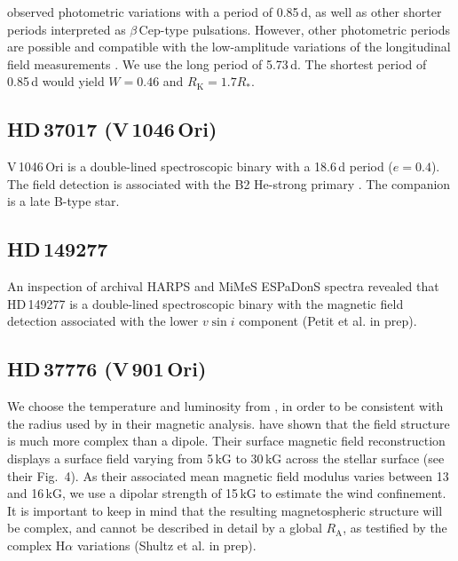 \documentclass[useAMS,usenatbib]{mn2e}
\newcommand{\ra}{R_\mathrm{A}}
\newcommand{\rk}{R_\mathrm{K}}
\newcommand{\rs}{R_\ast}
\newcommand{\vsini}{v \sin i}
\begin{document}
\citet{1991A&A...243..148M} observed photometric variations with a period of 0.85\,d, as well as other shorter periods interpreted as $\beta$\,Cep-type pulsations. However, other photometric periods are possible and compatible with the low-amplitude variations of the longitudinal field measurements \citep{Neiner2012_96446}. We use the long period of 5.73\,d. The shortest period of 0.85\,d would yield $W=0.46$ and $\rk=1.7\rs$.

\setcounter{subsection}{29}
\subsection{HD\,37017 (V\,1046\,Ori)}

V\,1046\,Ori is a double-lined spectroscopic binary with a 18.6\,d period ($e=0.4$). The field detection is associated with the B2 He-strong primary \citep{1998A&A...337..183B}. The companion is a late B-type star. 

\setcounter{subsection}{31}
\subsection{HD\,149277}

An inspection of archival HARPS and MiMeS ESPaDonS spectra revealed that HD\,149277 is a double-lined spectroscopic binary with the magnetic field detection associated with the lower $\vsini$ component (Petit et al. in prep). 

\setcounter{subsection}{33}
\subsection{HD\,37776 (V\,901\,Ori)}

We choose the temperature and luminosity from \citet{2007A&A...470..685L}, in order to be consistent with the radius used by \citet{2011ApJ...726...24K} in their magnetic analysis. \citet{2011ApJ...726...24K} have shown that the field structure is much more complex than a dipole. Their surface magnetic field reconstruction displays a surface field varying from 5\,kG to 30\,kG across the stellar surface (see their Fig.~4). As their associated mean magnetic field modulus varies between 13 and 16\,kG, we use a dipolar strength of 15\,kG to estimate the wind confinement. It is important to keep in mind that the resulting magnetospheric structure will be complex, and cannot be described in detail by a global $\ra$, as testified by the complex H$\alpha$ variations (Shultz et al. in prep). 
\end{document}
